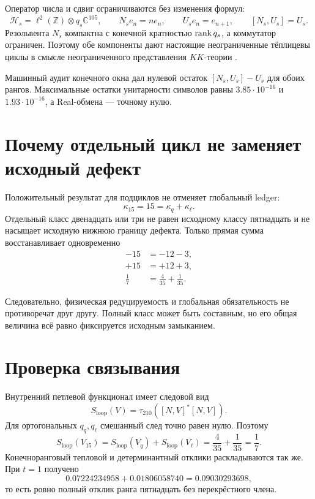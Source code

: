 Оператор числа и сдвиг ограничиваются без изменения формул:
\begin{equation}
 \mathcal H_s=\ell^2(\mathbb Z)\otimes q_s\mathbb C^{105},
 \qquad
 N_se_n=ne_n,
 \qquad
 U_se_n=e_{n+1},
 \qquad
 [N_s,U_s]=U_s.
\end{equation}
Резольвента $N_s$ компактна с конечной кратностью $\operatorname{rank} q_s$, а
коммутатор ограничен. Поэтому обе компоненты дают настоящие
неограниченные тёплицевы циклы в смысле неограниченного представления
$KK$-теории \cite{component-boundary-baaj-julg1983}.

Машинный аудит конечного окна дал нулевой остаток $[N_s,U_s]-U_s$ для
обоих рангов. Максимальные остатки унитарности символов равны
$3.85\cdot10^{-16}$ и $1.93\cdot10^{-16}$, а Real-обмена --- точному
нулю.

\section{Почему отдельный цикл не заменяет исходный дефект}

Положительный результат для подциклов не отменяет глобальный ledger:
\begin{equation}
 \kappa_{15}=15=\kappa_q+\kappa_\ell.
 \label{eq:v6-component-boundary-global-sum}
\end{equation}
Отдельный класс двенадцать или три не равен исходному классу пятнадцать и
не насыщает исходную нижнюю границу дефекта. Только прямая сумма
восстанавливает одновременно
\begin{align}
 -15&=-12-3,\\
 +15&=+12+3,\\
 \frac17&=\frac4{35}+\frac1{35}.
\end{align}

Следовательно, физическая редуцируемость и глобальная обязательность не
противоречат друг другу. Полный класс может быть составным, но его общая
величина всё равно фиксируется исходным замыканием.

\section{Проверка связывания}

Внутренний петлевой функционал имеет следовой вид
\begin{equation}
 S_{\mathrm{loop}}(V)=\tau_{210}([N,V]^*[N,V]).
\end{equation}
Для ортогональных $q_q,q_\ell$ смешанный след точно равен нулю. Поэтому
\begin{equation}
 S_{\mathrm{loop}}(V_{15})
 =S_{\mathrm{loop}}(V_q)+S_{\mathrm{loop}}(V_\ell)
 =\frac4{35}+\frac1{35}=\frac17.
 \label{eq:v6-component-boundary-action-additivity}
\end{equation}
Конечноранговый тепловой и детерминантный отклики раскладываются так же.
При $t=1$ получено
\begin{equation}
 0.07224234958+0.01806058740=0.09030293698,
\end{equation}
то есть ровно полный отклик ранга пятнадцать без перекрёстного члена.

